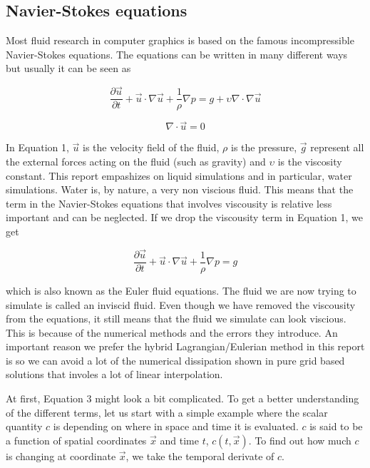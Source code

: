 \subsection{Navier-Stokes equations}

Most fluid research in computer graphics is based on the famous incompressible Navier-Stokes equations. The equations can be written in many different ways but usually it can be seen as

\begin{equation}
\frac{\partial \vec{u}}{\partial t} + \vec{u} \cdot \nabla \vec{u} + \frac{1}{\rho}\nabla p = g + \upsilon \nabla \cdot \nabla \vec{u}
\end{equation}

\begin{equation}
\nabla \cdot \vec{u} = 0
\end {equation}

In Equation 1, $\vec{u}$ is the velocity field of the fluid, $\rho$ is the pressure, $\vec{g}$ represent all the external forces acting on the fluid (such as gravity) and $\upsilon$ is the viscosity constant. This report empashizes on liquid simulations and in particular, water simulations. Water is, by nature, a very non viscious fluid. This means that the term in the Navier-Stokes equations that involves viscousity is relative less important and can be neglected. If we drop the viscousity term in Equation 1, we get

\begin{equation}
\frac{\partial \vec{u}}{\partial t} + \vec{u} \cdot \nabla \vec{u} + \frac{1}{\rho}\nabla p = g
\label{eulereq}
\end{equation}

which is also known as the Euler fluid equations. The fluid we are now trying to simulate is called an inviscid fluid. Even though we have removed the viscousity from the equations, it still means that the fluid we simulate can look viscious. This is because of the numerical methods and the errors they introduce. An important reason we prefer the hybrid Lagrangian/Eulerian method in this report is so we can avoid a lot of the numerical dissipation shown in pure grid based solutions that involes a lot of linear interpolation. 
\newline

At first, Equation 3 might look a bit complicated. To get a better understanding of the different terms, let us start with a simple example where the scalar quantity $c$ is depending on where in space and time it is evaluated. $c$ is said to be a function of spatial coordinates $\vec{x}$ and time $t$, $c(t,\vec{x})$. To find out how much $c$ is changing at coordinate $\vec{x}$, we take the temporal derivate of $c$.

